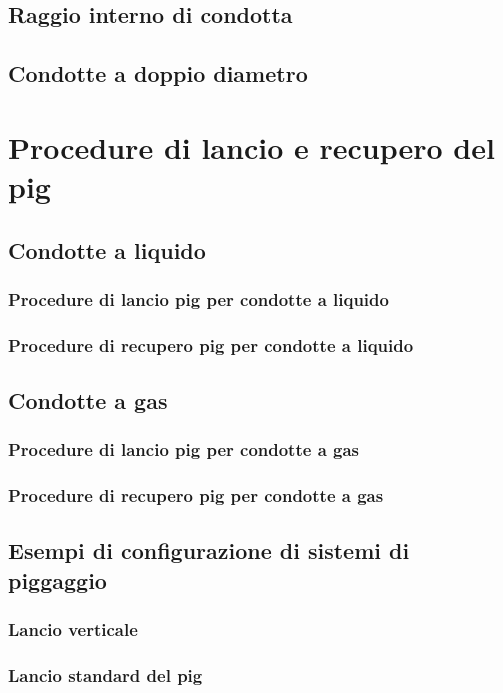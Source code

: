 \subsection{Raggio interno di condotta}
\subsection{Condotte a doppio diametro}


\section{Procedure di lancio e recupero del pig}

\subsection{Condotte a liquido}
\subsubsection{Procedure di lancio pig per condotte a liquido}
\subsubsection{Procedure di recupero pig per condotte a liquido}

\subsection{Condotte a gas}
\subsubsection{Procedure di lancio pig per condotte a gas}
\subsubsection{Procedure di recupero pig per condotte a gas}

\subsection{Esempi di configurazione di sistemi di piggaggio}
\subsubsection{Lancio verticale}
\subsubsection{Lancio standard del pig}
